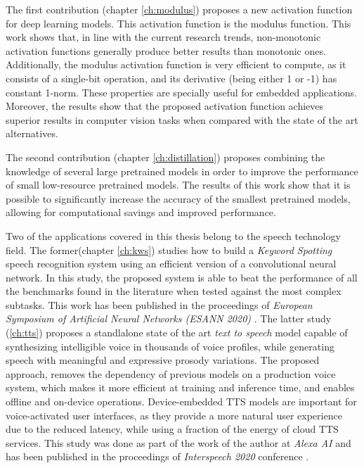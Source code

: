 The first contribution (chapter \ref{ch:modulus}) proposes a new activation function for deep learning models. This activation function is the modulus function. This work shows that, in line with the current research trends, non-monotonic activation functions generally produce better results than monotonic ones. Additionally, the modulus activation function is very efficient to compute, as it consists of a single-bit operation, and its derivative (being either 1 or -1) has constant 1-norm. These properties are specially useful for embedded applications. Moreover, the results show that the proposed activation function achieves superior results in computer vision tasks when compared with the state of the art alternatives.

The second contribution (chapter \ref{ch:distillation}) proposes combining the knowledge of several large pretrained models in order to improve the performance of small low-resource pretrained models. The results of this work show that it is possible to significantly increase the accuracy of the smallest pretrained models, allowing for computational savings and improved performance.

Two of the applications covered in this thesis belong to the speech technology field. The former(chapter \ref{ch:kws}) studies how to build a \textit{Keyword Spotting} speech recognition system using an efficient version of a convolutional neural network. In this study, the proposed system is able to beat the performance of all the benchmarks found in the literature when tested against the most complex subtasks. This work has been published in the proceedings of \textit{European Symposium of Artificial Neural Networks (ESANN 2020)} \autocite{valles2021a}. The latter study (\ref{ch:tts}) proposes a standlalone state of the art \textit{text to speech} model capable of synthesizing intelligible voice in thousands of voice profiles, while generating speech with meaningful and expressive prosody variations. The proposed approach, removes the dependency of previous models on a production voice system, which makes it more efficient at training and inference time, and enables offline and on-device operations. Device-embedded TTS models are important for voice-activated user interfaces, as they provide a more natural user experience due to the reduced latency, while using a fraction of the energy of cloud TTS services. This study was done as part of the work of the author at \textit{Alexa AI} and has been published in the proceedings of \textit{Interspeech 2020} conference \autocite{valles2021b}.

